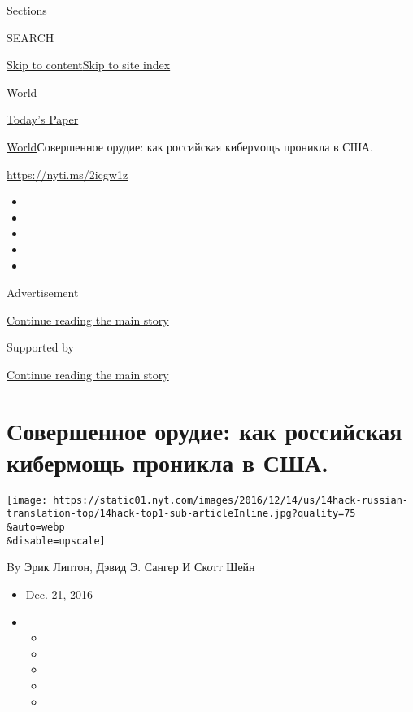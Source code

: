 Sections

SEARCH

\protect\hyperlink{site-content}{Skip to
content}\protect\hyperlink{site-index}{Skip to site index}

\href{https://www.nytimes.com/section/world}{World}

\href{https://myaccount.nytimes.com/auth/login?response_type=cookie\&client_id=vi}{}

\href{https://www.nytimes.com/section/todayspaper}{Today's Paper}

\href{/section/world}{World}\textbar{}Совершенное орудие: как российская
кибермощь проникла в США.

\url{https://nyti.ms/2icgw1z}

\begin{itemize}
\item
\item
\item
\item
\item
\end{itemize}

Advertisement

\protect\hyperlink{after-top}{Continue reading the main story}

Supported by

\protect\hyperlink{after-sponsor}{Continue reading the main story}

\hypertarget{ux441ux43eux432ux435ux440ux448ux435ux43dux43dux43eux435-ux43eux440ux443ux434ux438ux435-ux43aux430ux43a-ux440ux43eux441ux441ux438ux439ux441ux43aux430ux44f-ux43aux438ux431ux435ux440ux43cux43eux449ux44c-ux43fux440ux43eux43dux438ux43aux43bux430-ux432-ux441ux448ux430}{%
\section{Совершенное орудие: как российская кибермощь проникла в
США.}\label{ux441ux43eux432ux435ux440ux448ux435ux43dux43dux43eux435-ux43eux440ux443ux434ux438ux435-ux43aux430ux43a-ux440ux43eux441ux441ux438ux439ux441ux43aux430ux44f-ux43aux438ux431ux435ux440ux43cux43eux449ux44c-ux43fux440ux43eux43dux438ux43aux43bux430-ux432-ux441ux448ux430}}

\texttt{[image: https://static01.nyt.com/images/2016/12/14/us/14hack-russian-translation-top/14hack-top1-sub-articleInline.jpg?quality=75\\\&auto=webp\\\&disable=upscale]}

By Эрик Липтон, Дэвид Э. Сангер И Скотт Шейн

\begin{itemize}
\item
  Dec. 21, 2016
\item
  \begin{itemize}
  \item
  \item
  \item
  \item
  \item
  \end{itemize}
\end{itemize}

